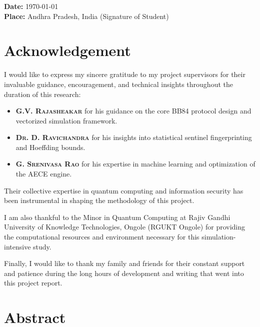\documentclass[journal,onecolumn,12pt,draftclsnofoot]{IEEEtran}
\begin{document}
\vspace{1in}

\noindent \textbf{Date:} \today \\
\noindent \textbf{Place:} Andhra Pradesh, India \hfill (Signature of Student)

\newpage

\section*{Acknowledgement}
\vspace{0.5in}

I would like to express my sincere gratitude to my project supervisors for their invaluable guidance, encouragement, and technical insights throughout the duration of this research:
\begin{itemize}
    \item \textbf{\textsc{G.V. Rajasheakar}} for his guidance on the core BB84 protocol design and vectorized simulation framework.
    \item \textbf{\textsc{Dr. D. Ravichandra}} for his insights into statistical sentinel fingerprinting and Hoeffding bounds.
    \item \textbf{\textsc{G. Srenivasa Rao}} for his expertise in machine learning and optimization of the AECE engine.
\end{itemize}
Their collective expertise in quantum computing and information security has been instrumental in shaping the methodology of this project.

I am also thankful to the Minor in Quantum Computing at Rajiv Gandhi University of Knowledge Technologies, Ongole (RGUKT Ongole) for providing the computational resources and environment necessary for this simulation-intensive study. 

Finally, I would like to thank my family and friends for their constant support and patience during the long hours of development and writing that went into this project report.

\newpage

\section*{Abstract}
\vspace{0.2in}
\end{document}
